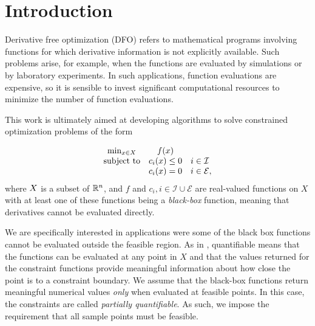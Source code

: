 
\section{Introduction}

Derivative free optimization (DFO) refers to mathematical programs involving functions for which derivative information is not explicitly available.
Such problems arise, for example, when the functions are evaluated by simulations or by laboratory experiments.
In such applications, function evaluations are expensive, so it is sensible to invest significant computational resources to minimize the number of function evaluations.

This work is ultimately aimed at developing algorithms to solve constrained optimization problems of the form 

\[ \begin{array}{ccl} \min_{x \in X} & f(x) \\
\mbox{subject to} & c_i(x) \le 0 & i \in \mathcal{I} \\
& c_i(x) = 0 & i \in \mathcal{E},
\end{array}
\]
where $X$ is a subset of $\mathbb R^n$, and $f$ and $c_i, i \in \mathcal{I} \cup \mathcal{E}$ are real-valued functions on $X$ with at least one of these functions being a {\em black-box} function, meaning that derivatives cannot be evaluated directly.


We are specifically interested in applications were some of the black box functions cannot be evaluated outside the feasible region.
As in \cite{DUMMY:typesofconstraints}, quantifiable means that the functions can be evaluated at any point in $X$ and that the values returned for the constraint functions provide meaningful information about how close the point is to a constraint boundary.
We assume that the black-box functions return meaningful numerical values \emph{only} when evaluated at feasible points.
In this case, the constraints are called {\em partially quantifiable}.   
As such, we impose the requirement that all sample  points must be feasible.

